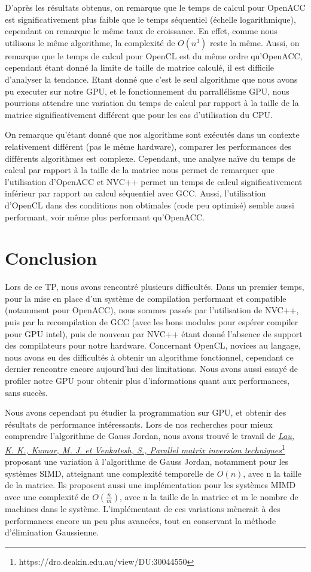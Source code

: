 \documentclass[a4paper, french]{article}
\begin{document}
D'après les résultats obtenus, on remarque que le temps de calcul pour OpenACC est significativement plus faible que le temps séquentiel (échelle logarithmique), cependant on remarque le même taux de croissance. En effet, comme nous utilisons le même algorithme, la complexité de $O(n^3)$ reste la même. Aussi, on remarque que le temps de calcul pour OpenCL est du même ordre qu'OpenACC, cependant étant donné la limite de taille de matrice calculé, il est difficile d'analyser la tendance. Etant donné que c'est le seul algorithme que nous avons pu executer sur notre GPU, et le fonctionnement du parrallélisme GPU, nous pourrions attendre une variation du temps de calcul par rapport à la taille de la matrice significativement différent que pour les cas d'utilisation du CPU.

On remarque qu'étant donné que nos algorithme sont exécutés dans un contexte relativement différent (pas le même hardware), comparer les performances des différents algorithmes est complexe. Cependant, une analyse naïve du temps de calcul par rapport à la taille de la matrice nous permet de remarquer que l'utilisation d'OpenACC et NVC++ permet un temps de calcul significativement inférieur par rapport au calcul séquentiel avec GCC. Aussi, l'utilisation d'OpenCL dans des conditions non obtimales (code peu optimisé) semble aussi performant, voir même plus performant qu'OpenACC.

\section{Conclusion}

Lors de ce TP, nous avons rencontré plusieurs difficultés. Dans un premier temps, pour la mise en place d'un système de compilation performant et compatible (notamment pour OpenACC), nous sommes passés par l'utilisation de NVC++, puis par la recompilation de GCC (avec les bons modules pour espérer compiler pour GPU intel), puis de nouveau par NVC++ étant donné l'absence de support des compilateurs pour notre hardware. Concernant OpenCL, novices au langage, nous avons eu des difficultés à obtenir un algorithme fonctionnel, cependant ce dernier rencontre encore aujourd'hui des limitations. Nous avons aussi essayé de profiler notre GPU pour obtenir plus d'informations quant aux performances, sans succès.

Nous avons cependant pu étudier la programmation sur GPU, et obtenir des résultats de performance intéressants.
Lors de nos recherches pour mieux comprendre l'algorithme de Gauss Jordan, nous avons trouvé le travail de \href{https://dro.deakin.edu.au/view/DU:30044550}{\textit{\underline{Lau, K. K., Kumar, M. J. et Venkatesh, S., Parallel matrix inversion techniques}}}\footnote{https://dro.deakin.edu.au/view/DU:30044550} proposant une variation à l'algorithme de Gauss Jordan, notamment pour les systèmes SIMD, atteignant une complexité temporelle de $O(n)$, avec n la taille de la matrice. Ils proposent aussi une implémentation pour les systèmes MIMD avec une complexité de $O(\frac{n}{m})$, avec n la taille de la matrice et m le nombre de machines dans le système. L'implémentant de ces variations mènerait à des performances encore un peu plus avancées, tout en conservant la méthode d'élimination Gaussienne.
\end{document}
